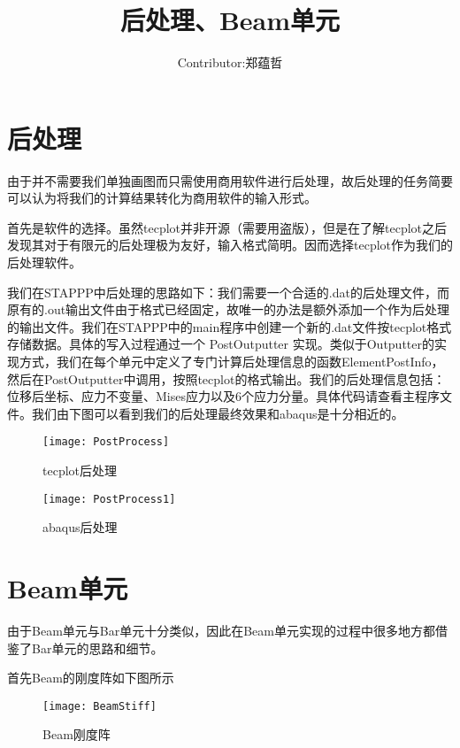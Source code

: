 \documentclass[UTF8]{ctexart}
\title{后处理、Beam单元}
\author{Contributor:郑蕴哲}
\begin{document}
\maketitle

\setcounter{MaxMatrixCols}{25}  %

\section{后处理}

由于并不需要我们单独画图而只需使用商用软件进行后处理，故后处理的任务简要可以认为将我们的计算结果转化为商用软件的输入形式。

首先是软件的选择。虽然tecplot并非开源（需要用盗版），但是在了解tecplot之后发现其对于有限元的后处理极为友好，输入格式简明。因而选择tecplot作为我们的后处理软件。

我们在STAPPP中后处理的思路如下：我们需要一个合适的.dat的后处理文件，而原有的.out输出文件由于格式已经固定，故唯一的办法是额外添加一个作为后处理的输出文件。我们在STAPPP中的main程序中创建一个新的.dat文件按tecplot格式存储数据。具体的写入过程通过一个 PostOutputter 实现。类似于Outputter的实现方式，我们在每个单元中定义了专门计算后处理信息的函数ElementPostInfo，然后在PostOutputter中调用，按照tecplot的格式输出。我们的后处理信息包括：位移后坐标、应力不变量、Mises应力以及6个应力分量。具体代码请查看主程序文件。我们由下图可以看到我们的后处理最终效果和abaqus是十分相近的。

\begin{figure}[h]
	\begin{minipage}[t]{0.5\linewidth}
		\centering
		\texttt{[image: PostProcess]}
		\caption{tecplot后处理}
	\end{minipage}%
	\hfill
	\begin{minipage}[t]{0.5\linewidth}
		\centering
		\texttt{[image: PostProcess1]}
		\caption{abaqus后处理}
	\end{minipage}
\end{figure}

\section{Beam单元}
由于Beam单元与Bar单元十分类似，因此在Beam单元实现的过程中很多地方都借鉴了Bar单元的思路和细节。

首先Beam的刚度阵如下图所示
\begin{figure}[h]%
	\centering  %
	\texttt{[image: BeamStiff]}  %
	\caption{Beam刚度阵}  %

\end{figure}
\end{document}
